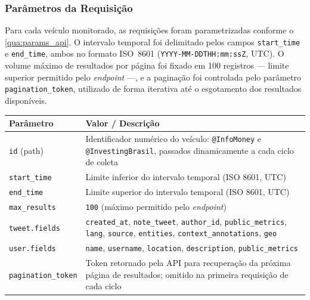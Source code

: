 \subsubsection{Parâmetros da Requisição}
\label{subsubsec:parametros_api}

Para cada veículo monitorado, as requisições foram parametrizadas conforme o \autoref{qua:params_api}. O intervalo temporal foi delimitado pelos campos \texttt{start\_time} e \texttt{end\_time}, ambos no formato ISO~8601 (\texttt{YYYY-MM-DDTHH:mm:ssZ}, UTC). O volume máximo de resultados por página foi fixado em 100 registros — limite superior permitido pelo \textit{endpoint} —, e a paginação foi controlada pelo parâmetro \texttt{pagination\_token}, utilizado de forma iterativa até o esgotamento dos resultados disponíveis.

\begin{quadro}[htb]
	\caption{\label{qua:params_api}Parâmetros utilizados nas requisições ao \textit{endpoint} \texttt{GET /2/users/\{id\}/tweets}}
	
	\begin{tabular}{|p{4.5cm}|p{10.5cm}|}
		\hline
		\textbf{Parâmetro} & \textbf{Valor / Descrição} \\
		\hline
		
		\texttt{id} (path) & Identificador numérico do veículo: \texttt{@InfoMoney} e \texttt{@InvestingBrasil}, passados dinamicamente a cada ciclo de coleta \\
		\hline
		
		\texttt{start\_time} & Limite inferior do intervalo temporal (ISO 8601, UTC) \\
		\hline
		
		\texttt{end\_time} & Limite superior do intervalo temporal (ISO 8601, UTC) \\
		\hline
		
		\texttt{max\_results} & \texttt{100} (máximo permitido pelo \textit{endpoint}) \\
		\hline
		
		\texttt{tweet.fields} & \texttt{created\_at}, \texttt{note\_tweet}, \texttt{author\_id}, \texttt{public\_metrics}, \texttt{lang}, \texttt{source}, \texttt{entities}, \texttt{context\_annotations}, \texttt{geo} \\
		\hline
		
		\texttt{user.fields} & \texttt{name}, \texttt{username}, \texttt{location}, \texttt{description}, \texttt{public\_metrics} \\
		\hline
		
		\texttt{pagination\_token} & Token retornado pela API para recuperação da próxima página de resultados; omitido na primeira requisição de cada ciclo \\
		\hline
	\end{tabular}
\end{quadro}

